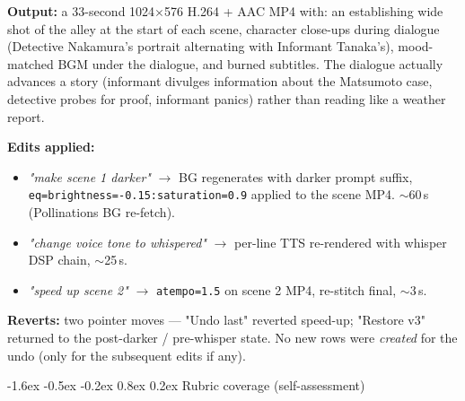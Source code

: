 \documentclass[11pt,a4paper]{article}
\makeatletter
\renewcommand\section{\@startsection{section}{1}{\z@}%
   {-1.6ex \@plus -0.5ex \@minus -0.2ex}%
   {0.8ex \@plus 0.2ex}%
   {\Large\bfseries\color{accent}}}
\newcommand{\rarr}{\(\rightarrow\)}
\newcommand{\code}[1]{\texttt{\small #1}}
\makeatother
\begin{document}
\smallskip
\textbf{Output:} a 33-second 1024$\times$576 H.264 + AAC MP4 with: an
establishing wide shot of the alley at the start of each scene, character
close-ups during dialogue (Detective Nakamura's portrait alternating with
Informant Tanaka's), mood-matched BGM under the dialogue, and burned
subtitles. The dialogue actually advances a story (informant divulges
information about the Matsumoto case, detective probes for proof, informant
panics) rather than reading like a weather report.

\smallskip
\textbf{Edits applied:}
\begin{itemize}
  \item \emph{"make scene 1 darker"} \rarr{} BG regenerates with darker prompt
        suffix, \code{eq=brightness=-0.15:saturation=0.9} applied to the scene
        MP4. $\sim$60\,s (Pollinations BG re-fetch).
  \item \emph{"change voice tone to whispered"} \rarr{} per-line TTS
        re-rendered with whisper DSP chain, $\sim$25\,s.
  \item \emph{"speed up scene 2"} \rarr{} \code{atempo=1.5} on scene 2 MP4,
        re-stitch final, $\sim$3\,s.
\end{itemize}

\textbf{Reverts:} two pointer moves --- "Undo last" reverted speed-up; "Restore v3"
returned to the post-darker / pre-whisper state. No new rows were
\emph{created} for the undo (only for the subsequent edits if any).

\section{Rubric coverage (self-assessment)}
\end{document}
